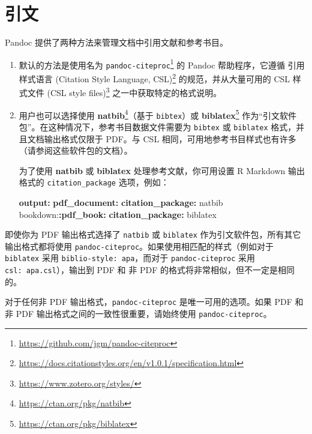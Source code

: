 \documentclass[
  12pt,
]{krantz}
\newenvironment{Shaded}{\begin{snugshade}}{\end{snugshade}}
\newcommand{\AttributeTok}[1]{\textcolor[rgb]{0.13,0.29,0.53}{#1}}
\newcommand{\FunctionTok}[1]{\textcolor[rgb]{0.13,0.29,0.53}{\textbf{#1}}}
\newcommand{\KeywordTok}[1]{\textcolor[rgb]{0.13,0.29,0.53}{\textbf{#1}}}
\renewcommand{\href}[2]{#2\footnote{\url{#1}}}
\theoremstyle{definition}
\theoremstyle{definition}
\theoremstyle{definition}
\theoremstyle{definition}
\theoremstyle{remark}
\begin{document}
\hypertarget{citations}{%
\section{引文}\label{citations}}

Pandoc 提供了两种方法来管理文档中引用文献和参考书目。

\begin{enumerate}
\def\labelenumi{\arabic{enumi}.}
\item
  默认的方法是使用名为 \href{https://github.com/jgm/pandoc-citeproc}{\texttt{pandoc-citeproc}} 的 Pandoc 帮助程序，它遵循 \href{https://docs.citationstyles.org/en/v1.0.1/specification.html}{引用样式语言 (Citation Style Language, CSL)} 的规范，并从大量可用的 \href{https://www.zotero.org/styles/}{CSL 样式文件 (CSL style files)} 之一中获取特定的格式说明。
\item
  用户也可以选择使用 \href{https://ctan.org/pkg/natbib}{\textbf{natbib}}（基于 \texttt{bibtex}）或 \href{https://ctan.org/pkg/biblatex}{\textbf{biblatex}} 作为``引文软件包''。在这种情况下，参考书目数据文件需要为 \texttt{bibtex} 或 \texttt{biblatex} 格式，并且文档输出格式仅限于 PDF。与 CSL 相同，可用地参考书目样式也有许多（请参阅这些软件包的文档）。

  为了使用 \textbf{natbib} 或 \textbf{biblatex} 处理参考文献，你可用设置 R Markdown 输出格式的 \texttt{citation\_package} 选项，例如：

\begin{Shaded}
\begin{Highlighting}[]
\FunctionTok{output}\KeywordTok{:}
\AttributeTok{  }\FunctionTok{pdf\_document}\KeywordTok{:}
\AttributeTok{    }\FunctionTok{citation\_package}\KeywordTok{:}\AttributeTok{ natbib}
\AttributeTok{  bookdown:}\FunctionTok{:pdf\_book}\KeywordTok{:}
\AttributeTok{    }\FunctionTok{citation\_package}\KeywordTok{:}\AttributeTok{ biblatex}
\end{Highlighting}
\end{Shaded}
\end{enumerate}

即使你为 PDF 输出格式选择了 \texttt{natbib} 或 \texttt{biblatex} 作为引文软件包，所有其它输出格式都将使用 \texttt{pandoc-citeproc}。如果使用相匹配的样式（例如对于 \texttt{biblatex} 采用 \texttt{biblio-style:\ apa}，而对于 \texttt{pandoc-citeproc} 采用 \texttt{csl:\ apa.csl}），输出到 PDF 和 非 PDF 的格式将非常相似，但不一定是相同的。

对于任何非 PDF 输出格式，\texttt{pandoc-citeproc} 是唯一可用的选项。如果 PDF 和非 PDF 输出格式之间的一致性很重要，请始终使用 \texttt{pandoc-citeproc}。
\end{document}
